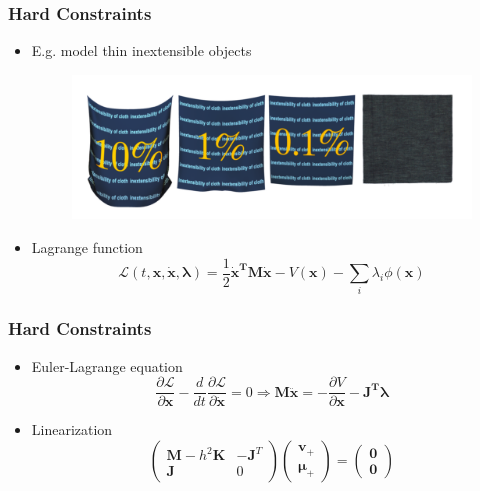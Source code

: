 \documentclass[serif,mathserif]{beamer}
\newcommand{\BOLD}[1]{\mathbf{#1}}
\newcommand{\PDIF}[2]{\frac{\partial #1}{\partial #2}}
\begin{document}
\begin{frame}
 \frametitle{Hard Constraints}
 \begin{itemize}
  \item E.g. model thin inextensible objects 
  \begin{figure}
    \centering 
    \includegraphics[scale=0.2]{img/inextensible.png}
  \end{figure}
  \item Lagrange function
    \begin{equation*}
      \mathcal{L}(t, \BOLD{x}, \BOLD{\dot x}, \BOLD{\lambda}) = \frac{1}{2}\BOLD{\dot x^T M \dot x} - V(\BOLD{x}) - \sum_i \lambda_i \phi(\BOLD{x})
    \end{equation*}
 \end{itemize}
\end{frame}

\begin{frame}
 \frametitle{Hard Constraints}
 \begin{itemize}
    \item Euler-Lagrange equation
    \begin{equation*}
      \PDIF{\mathcal{L}}{\BOLD{x}}-\frac{d}{dt}\PDIF{\mathcal{L}}{\BOLD{\dot x}} = 0
      \Longrightarrow \BOLD{M\ddot x} = -\PDIF{V}{\BOLD{x}}-\BOLD{J^T\lambda}
    \end{equation*}
    \pause
    \pause
    \item Linearization 
    \begin{equation*}
      \begin{pmatrix}
	\BOLD{M}-h^2\BOLD{K} & -\BOLD{J}^T \\
	\BOLD{J} & 0
      \end{pmatrix}
      \begin{pmatrix}
       \BOLD{v}_{+} \\ \BOLD{\mu}_{+}
      \end{pmatrix}
      =
      \begin{pmatrix}
       \BOLD{0} \\ \BOLD{0}
      \end{pmatrix}
    \end{equation*}
    \pause
 \end{itemize}
 \gridlines 
\end{frame}
\end{document}
